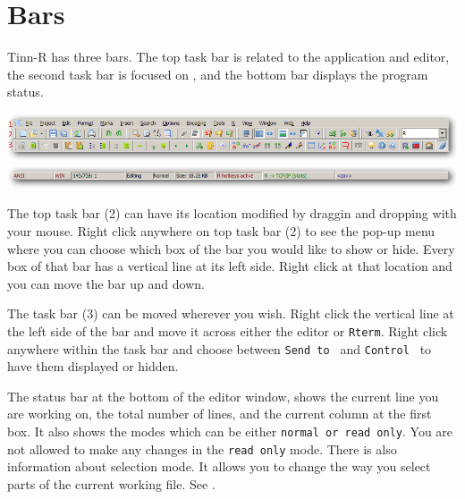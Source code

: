 
\section{Bars}

Tinn-R has three bars. The top task bar is related to the application and editor,
the second task bar is focused on \RR{}, and the bottom bar displays the program status.

\includegraphics[scale=0.50]{./res/parts_02.png}
\includegraphics[scale=0.50]{./res/secrets_statusbar.png}

The top task bar (2) can have its location modified by draggin and dropping with your mouse.
Right click anywhere on top task bar (2) to see the pop-up menu where you can choose which box
of the bar you would like to show or hide. Every box of that bar has a vertical line at its left side.
Right click at that location and you can move the bar up and down.

The \RR{} task bar (3) can be moved wherever you wish. Right click the vertical line at the left side of the
bar and move it across either the editor or \texttt{Rterm}. Right click anywhere within the \RR{} task bar and choose between
\texttt{Send to \RR{}} and \texttt{Control \RR{}} to have them displayed or hidden.

The status bar at the bottom of the editor window, shows the current line you are working on,
the total number of lines, and the current column at the first box.
It also shows the modes which can be either \texttt{normal or read only}.
You are not allowed to make any changes in the \texttt{read only} mode.
There is also information about selection mode. It allows you to change the way you select parts of the current working file.
See \textit{}.
